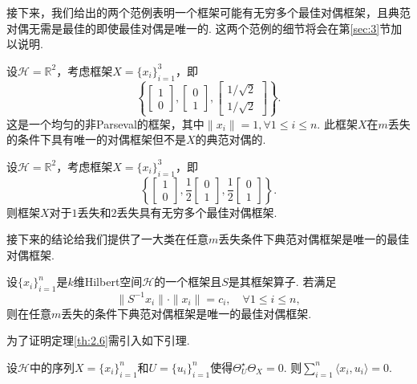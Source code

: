 \documentclass[cn,11pt,a4paper,founder]{elegantpaper}
\newcommand{\calH}{\mathcal{H}}
\newcommand{\bbR}{\mathbb{R}}
\begin{document}
接下来，我们给出的两个范例表明一个框架可能有无穷多个最佳对偶框架，且典范对偶无需是最佳的即使最佳对偶是唯一的. 这两个范例的细节将会在第\ref{sec:3}节加以说明.

\begin{example}\label{ex:2.4}
设\(\calH=\bbR^2\)，考虑框架\(X=\{x_i\}_{i=1}^3\)，即
\[
	\left\{\begin{bmatrix}
	1\\
	0
	\end{bmatrix},
	\begin{bmatrix}
	0\\
	1
	\end{bmatrix},
	\begin{bmatrix}
	1/\sqrt{2}\\
	1/\sqrt{2}
	\end{bmatrix}\right\}.
\]
这是一个均匀的非Parseval的框架，其中\(\|x_i\|=1,\forall 1\leqslant i\leqslant n\). 此框架\(X\)在\(m\)丢失的条件下具有唯一的对偶框架但不是\(X\)的典范对偶的.
\end{example}

\begin{example}\label{ex:2.5}
设\(\calH=\bbR^2\)，考虑框架\(X=\{x_i\}_{i=1}^3\)，即
\[
	\left\{\begin{bmatrix}
	1\\
	0
	\end{bmatrix},
	\frac{1}{2}\begin{bmatrix}
	0\\
	1
	\end{bmatrix},
	\frac{1}{2}\begin{bmatrix}
	0\\
	1
	\end{bmatrix}\right\}.
\]
则框架\(X\)对于\(1\)丢失和\(2\)丢失具有无穷多个最佳对偶框架.
\end{example}

接下来的结论给我们提供了一大类在任意\(m\)丢失条件下典范对偶框架是唯一的最佳对偶框架.

\begin{theorem}\label{th:2.6}
设\(\{x_i\}_{i=1}^n\)是\(k\)维Hilbert空间\(\calH\)的一个框架且\(S\)是其框架算子. 若满足
\[
	\|S^{-1}x_i\|\cdot\|x_i\|=c_i,\quad\forall 1\leqslant i\leqslant n,
\]
则在任意\(m\)丢失的条件下典范对偶框架是唯一的最佳对偶框架.
\end{theorem}

为了证明定理\ref{th:2.6}需引入如下引理.

\begin{lemma}\label{le:2.7}
设\(\calH\)中的序列\(X=\{x_i\}_{i=1}^n\)和\(U=\{u_i\}_{i=1}^n\)使得\(\Theta_U^{\star}\Theta_X=0\). 则\(\sum_{i=1}^n\langle x_i,u_i\rangle=0\).
\end{lemma}
\end{document}
